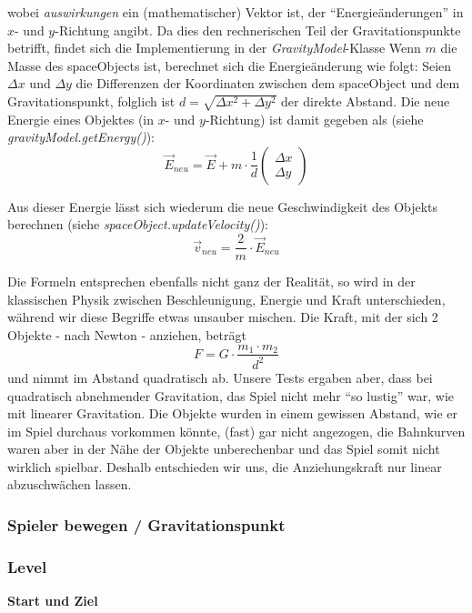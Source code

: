 \documentclass[12pt,a4paper]{scrartcl}
\newcommand{\q}[1]{``#1''}
\begin{document}
wobei \textit{auswirkungen} ein (mathematischer) Vektor ist, der \q{Energieänderungen} in $x$- und $y$-Richtung angibt.
Da dies den rechnerischen Teil der Gravitationspunkte betrifft, findet sich die Implementierung in der \textit{GravityModel}-Klasse
Wenn $m$ die Masse des spaceObjects ist, berechnet sich die Energieänderung wie folgt:
Seien $\Delta x$ und $\Delta y$ die Differenzen der Koordinaten zwischen dem spaceObject und dem Gravitationspunkt,
folglich ist $d = \sqrt{\Delta x^2 + \Delta y^2}$ der direkte Abstand. Die neue Energie eines Objektes (in $x$- und $y$-Richtung)
ist damit gegeben als (siehe \textit{gravityModel.getEnergy()}): 
\[ \vec{E}_{neu} = \vec{E} + m \cdot \frac{1}{d} \begin{pmatrix}\Delta x \\ \Delta y\end{pmatrix} \]

Aus dieser Energie lässt sich wiederum die neue Geschwindigkeit des Objekts berechnen (siehe \textit{spaceObject.updateVelocity()}):
\[ \vec{v}_{neu} = \frac{2}{m} \cdot \vec{E}_{neu}\] 

Die Formeln entsprechen ebenfalls nicht ganz der Realität, so wird in der klassischen Physik zwischen Beschleunigung, Energie und Kraft unterschieden,
während wir diese Begriffe etwas unsauber mischen. Die Kraft, mit der sich 2 Objekte - nach Newton - anziehen, beträgt
\[ F = G \cdot \frac{m_1 \cdot m_2}{d^2} \]
und nimmt im Abstand quadratisch ab. Unsere Tests ergaben aber, dass bei quadratisch abnehmender Gravitation, das
Spiel nicht mehr \q{so lustig} war, wie mit linearer Gravitation. Die Objekte wurden in einem gewissen Abstand, wie er
im Spiel durchaus vorkommen könnte, (fast) gar nicht angezogen, die Bahnkurven waren aber in der Nähe der Objekte
unberechenbar und das Spiel somit nicht wirklich spielbar. Deshalb entschieden wir uns, die Anziehungskraft
nur linear abzuschwächen lassen.


\subsubsection{Spieler bewegen / Gravitationspunkt}


\subsubsection{Level}

\textbf{Start und Ziel}
\\
\end{document}
